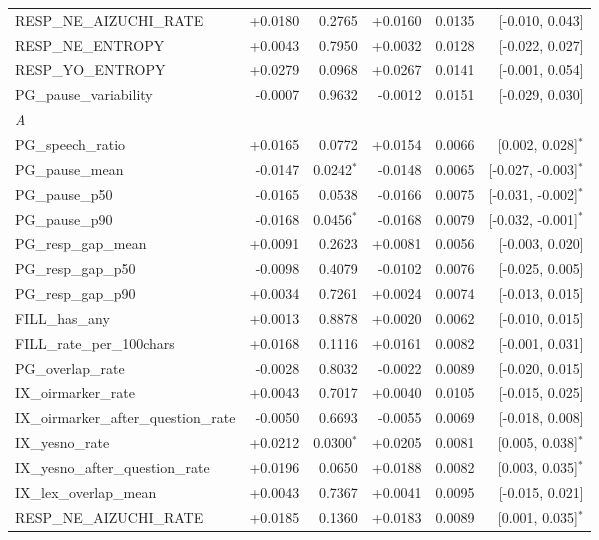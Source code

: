 \begin{longtable}{lrrrrr}
\quad RESP\_NE\_AIZUCHI\_RATE & +0.0180 & 0.2765 & +0.0160 & 0.0135 & [-0.010, 0.043] \\
\quad RESP\_NE\_ENTROPY & +0.0043 & 0.7950 & +0.0032 & 0.0128 & [-0.022, 0.027] \\
\quad RESP\_YO\_ENTROPY & +0.0279 & 0.0968 & +0.0267 & 0.0141 & [-0.001, 0.054] \\
\quad PG\_pause\_variability & -0.0007 & 0.9632 & -0.0012 & 0.0151 & [-0.029, 0.030] \\
\midrule
\multicolumn{6}{l}{\textit{A}} \\
\quad PG\_speech\_ratio & +0.0165 & 0.0772 & +0.0154 & 0.0066 & [0.002, 0.028]$^{*}$ \\
\quad PG\_pause\_mean & -0.0147 & 0.0242$^{*}$ & -0.0148 & 0.0065 & [-0.027, -0.003]$^{*}$ \\
\quad PG\_pause\_p50 & -0.0165 & 0.0538 & -0.0166 & 0.0075 & [-0.031, -0.002]$^{*}$ \\
\quad PG\_pause\_p90 & -0.0168 & 0.0456$^{*}$ & -0.0168 & 0.0079 & [-0.032, -0.001]$^{*}$ \\
\quad PG\_resp\_gap\_mean & +0.0091 & 0.2623 & +0.0081 & 0.0056 & [-0.003, 0.020] \\
\quad PG\_resp\_gap\_p50 & -0.0098 & 0.4079 & -0.0102 & 0.0076 & [-0.025, 0.005] \\
\quad PG\_resp\_gap\_p90 & +0.0034 & 0.7261 & +0.0024 & 0.0074 & [-0.013, 0.015] \\
\quad FILL\_has\_any & +0.0013 & 0.8878 & +0.0020 & 0.0062 & [-0.010, 0.015] \\
\quad FILL\_rate\_per\_100chars & +0.0168 & 0.1116 & +0.0161 & 0.0082 & [-0.001, 0.031] \\
\quad PG\_overlap\_rate & -0.0028 & 0.8032 & -0.0022 & 0.0089 & [-0.020, 0.015] \\
\quad IX\_oirmarker\_rate & +0.0043 & 0.7017 & +0.0040 & 0.0105 & [-0.015, 0.025] \\
\quad IX\_oirmarker\_after\_question\_rate & -0.0050 & 0.6693 & -0.0055 & 0.0069 & [-0.018, 0.008] \\
\quad IX\_yesno\_rate & +0.0212 & 0.0300$^{*}$ & +0.0205 & 0.0081 & [0.005, 0.038]$^{*}$ \\
\quad IX\_yesno\_after\_question\_rate & +0.0196 & 0.0650 & +0.0188 & 0.0082 & [0.003, 0.035]$^{*}$ \\
\quad IX\_lex\_overlap\_mean & +0.0043 & 0.7367 & +0.0041 & 0.0095 & [-0.015, 0.021] \\
\quad RESP\_NE\_AIZUCHI\_RATE & +0.0185 & 0.1360 & +0.0183 & 0.0089 & [0.001, 0.035]$^{*}$ \\

\end{longtable}
